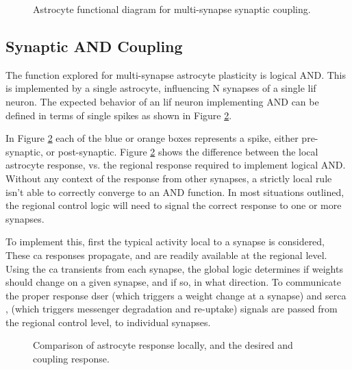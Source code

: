 \documentclass[conference]{IEEEtran}
\newcommand{\ca}{\gls{ca}\textrm{ }}
\newcommand{\dser}{\gls{dser}\textrm{ }}
\newcommand{\serca}{\gls{serca}\textrm{ }}
\newcommand{\asvgf}[4]{
	\begin{figure}[!htbp]
    	\centering
		\adjustbox{max width=#4\linewidth}{}
        \caption{#2.}
        \label{#3}
	\end{figure}
}
\begin{document}
\asvgf{figures/local-multi-compare.svg}{Astrocyte functional diagram for
  multi-synapse synaptic coupling}{fig:astro:syn_coupling}{1.0}

\subsection{Synaptic AND Coupling}
The function explored for multi-synapse astrocyte plasticity is logical
AND. This is implemented by a single astrocyte, influencing N synapses of a
single \gls{lif} neuron. The expected behavior of an \gls{lif} neuron
implementing AND can be defined in terms of single spikes as shown in Figure
\ref{fig:global-v-local-and-coupling}.

In Figure \ref{fig:global-v-local-and-coupling} each of the blue or orange boxes
represents a spike, either pre-synaptic, or post-synaptic. Figure
\ref{fig:global-v-local-and-coupling} shows the difference between the local
astrocyte response, vs. the regional response required to implement logical
AND. Without any context of the response from other synapses, a strictly local
rule isn't able to correctly converge to an AND function. In most situations
outlined, the regional control logic will need to signal the correct response to
one or more synapses.

To implement this, first the typical activity local to a synapse is considered,
These \ca responses propagate, and are readily available at the regional
level. Using the \ca transients from each synapse, the global logic determines
if weights should change on a given synapse, and if so, in what direction. To
communicate the proper response \dser (which triggers a weight change at a
synapse) and \serca, (which triggers messenger degradation and re-uptake)
signals are passed from the regional control level, to individual synapses.

\asvgf{figures/AstroAndCoupling_implementation.svg}{Comparison of astrocyte
  response locally, and the desired and coupling
  response}{fig:global-v-local-and-coupling}{1.0}

\end{document}
